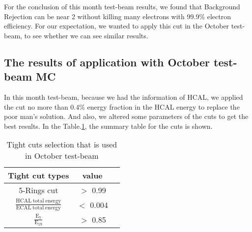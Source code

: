 \documentclass[12pt,twoside,a4paper,an,final]{cms-tdr}
\begin{document}
For the conclusion of this month test-beam results, we found that Background Rejection can be near 2 without killing many electrons with 99.9\% electron efficiency. For our expectation, we wanted to apply this cut in the October test-beam, to see whether we can see similar results. 

\subsection{The results of application with October test-beam MC}
In this month test-beam, because we had the information of HCAL, we applied the cut no more than 0.4\% energy fraction in the HCAL energy to replace the poor man's solution. And also, we altered some parameters of the cuts to get the best results. In the Table.\ref{basic_100}, the summary table for the cuts is shown.

\begin{table}[h]%
    \centering
    \begin{tabular}{|c|c|c|}
    \hline
    Tight cut types & value\\\hline
    5-Rings cut &  $>$ 0.99 \\\hline  
    $\frac{\mathrm{HCAL  \ total \  energy}}{\mathrm{ECAL \ total \ energy}}$ & $<$ 0.004 \\\hline  
    $\mathrm{\frac{E_{7}}{E_{19}}}$ & $>$ 0.85\\\hline  
        \end{tabular}
    \caption{Tight cuts selection that is used in October test-beam}\label{basic_100}  %
\end{table}
\end{document}

